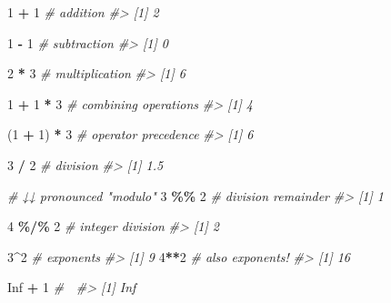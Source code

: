 \documentclass[
]{report}
\newenvironment{Shaded}{\begin{snugshade}}{\end{snugshade}}
\newcommand{\CommentTok}[1]{\textcolor[rgb]{0.56,0.35,0.01}{\textit{#1}}}
\newcommand{\DecValTok}[1]{\textcolor[rgb]{0.00,0.00,0.81}{#1}}
\newcommand{\NormalTok}[1]{#1}
\newcommand{\OperatorTok}[1]{\textcolor[rgb]{0.81,0.36,0.00}{\textbf{#1}}}
\newcommand{\OtherTok}[1]{\textcolor[rgb]{0.56,0.35,0.01}{#1}}
\newcommand{\StringTok}[1]{\textcolor[rgb]{0.31,0.60,0.02}{#1}}
\begin{document}
\begin{Shaded}
\begin{Highlighting}[]
\DecValTok{1} \OperatorTok{+}\StringTok{ }\DecValTok{1}                     \CommentTok{\# addition}
\CommentTok{\#\textgreater{} [1] 2}

\DecValTok{1} \OperatorTok{{-}}\StringTok{ }\DecValTok{1}                     \CommentTok{\# subtraction}
\CommentTok{\#\textgreater{} [1] 0}

\DecValTok{2} \OperatorTok{*}\StringTok{ }\DecValTok{3}                     \CommentTok{\# multiplication}
\CommentTok{\#\textgreater{} [1] 6}

\DecValTok{1} \OperatorTok{+}\StringTok{ }\DecValTok{1} \OperatorTok{*}\StringTok{ }\DecValTok{3}                 \CommentTok{\# combining operations}
\CommentTok{\#\textgreater{} [1] 4}

\NormalTok{(}\DecValTok{1} \OperatorTok{+}\StringTok{ }\DecValTok{1}\NormalTok{) }\OperatorTok{*}\StringTok{ }\DecValTok{3}               \CommentTok{\# operator precedence}
\CommentTok{\#\textgreater{} [1] 6}

\DecValTok{3} \OperatorTok{/}\StringTok{ }\DecValTok{2}                     \CommentTok{\# division}
\CommentTok{\#\textgreater{} [1] 1.5}

\CommentTok{\# ↓↓ pronounced "modulo"}
\DecValTok{3} \OperatorTok{\%\%}\StringTok{ }\DecValTok{2}                    \CommentTok{\# division remainder}
\CommentTok{\#\textgreater{} [1] 1}

\DecValTok{4} \OperatorTok{\%/\%}\StringTok{ }\DecValTok{2}                   \CommentTok{\# integer division}
\CommentTok{\#\textgreater{} [1] 2}

\DecValTok{3}\OperatorTok{\^{}}\DecValTok{2}                       \CommentTok{\# exponents}
\CommentTok{\#\textgreater{} [1] 9}
\DecValTok{4}\OperatorTok{**}\DecValTok{2}                      \CommentTok{\# also exponents!}
\CommentTok{\#\textgreater{} [1] 16}

\OtherTok{Inf} \OperatorTok{+}\StringTok{ }\DecValTok{1}       \CommentTok{\# 🤔}
\CommentTok{\#\textgreater{} [1] Inf}
\end{Highlighting}
\end{Shaded}
\end{document}
